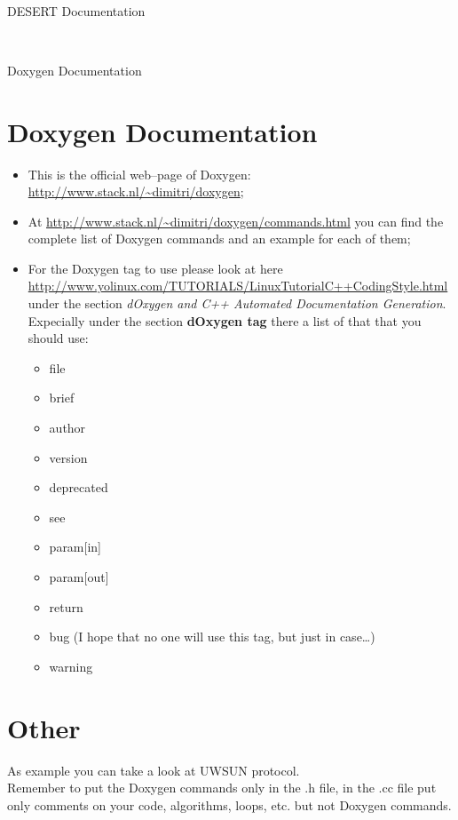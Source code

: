 \documentclass[12pt]{article}
\begin{document}
\begin{Large} \\ \end{Large}
\begin{large} {DESERT Documentation} \end{large}\\
\begin{large} {Doxygen Documentation} \end{large}

\section*{Doxygen Documentation}
\begin{itemize}
	\item This is the official web--page of Doxygen: \url{http://www.stack.nl/~dimitri/doxygen};
	\item At \url{http://www.stack.nl/~dimitri/doxygen/commands.html} you can find the complete list of Doxygen commands and an example for each of them;
	\item For the Doxygen tag to use please look at here \url{http://www.yolinux.com/TUTORIALS/LinuxTutorialC++CodingStyle.html} under the section \emph{dOxygen and C++ Automated Documentation Generation}. Expecially under the section \textbf{dOxygen tag} there a list of that that you should use:
	\begin{itemize}
		\item file
		\item brief
		\item author
		\item version
		\item deprecated
		\item see
		\item param[in]
		\item param[out]
		\item return
		\item bug (I hope that no one will use this tag, but just in case\ldots)
		\item warning
	\end{itemize}
\end{itemize}
\section*{Other}
As example you can take a look at UWSUN protocol.\\
Remember to put the Doxygen commands only in the .h file, in the .cc file put only comments on your code, algorithms, loops, etc. but not Doxygen commands.

	
\end{document}
